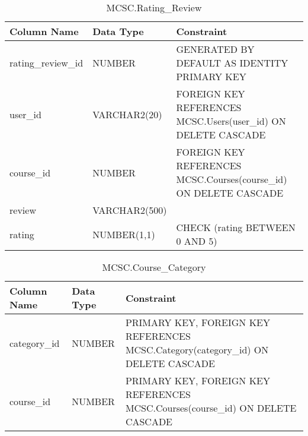\begin{table}[ht]
\centering
\begin{tabular}{|l|l|l|}
\hline
\textbf{Column Name} & \textbf{Data Type} & \textbf{Constraint} \\ \hline
rating\_review\_id & NUMBER & GENERATED BY DEFAULT AS IDENTITY PRIMARY KEY \\ \hline
user\_id & VARCHAR2(20) & FOREIGN KEY REFERENCES MCSC.Users(user\_id) ON DELETE CASCADE \\ \hline
course\_id & NUMBER & FOREIGN KEY REFERENCES MCSC.Courses(course\_id) ON DELETE CASCADE \\ \hline
review & VARCHAR2(500) &  \\ \hline
rating & NUMBER(1,1) & CHECK (rating BETWEEN 0 AND 5) \\ \hline
\end{tabular}
\caption{MCSC.Rating\_Review}
\end{table}
\begin{table}[ht]
\centering
\begin{tabular}{|l|l|l|}
\hline
\textbf{Column Name} & \textbf{Data Type} & \textbf{Constraint} \\ \hline
category\_id & NUMBER & PRIMARY KEY, FOREIGN KEY REFERENCES MCSC.Category(category\_id) ON DELETE CASCADE \\ \hline
course\_id & NUMBER & PRIMARY KEY, FOREIGN KEY REFERENCES MCSC.Courses(course\_id) ON DELETE CASCADE \\ \hline
\end{tabular}
\caption{MCSC.Course\_Category}
\end{table}



